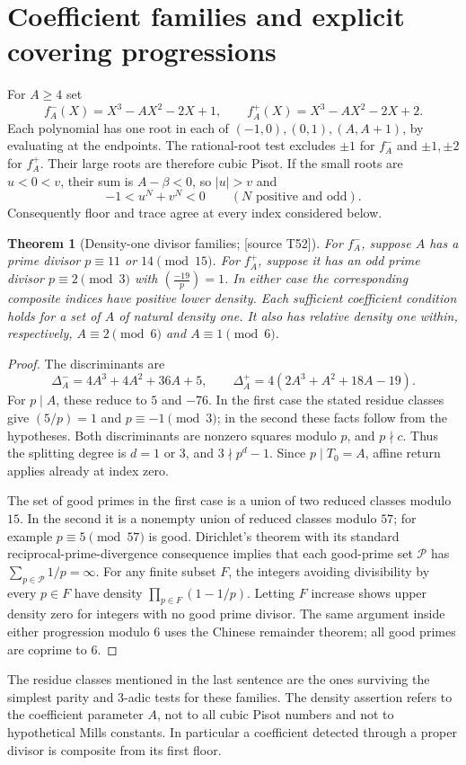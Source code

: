 \documentclass[11pt,a4paper]{article}
\newtheorem{theorem}{Theorem}[section]
\theoremstyle{definition}\newtheorem{definition}[theorem]{Definition}
\theoremstyle{remark}\newtheorem{remark}[theorem]{Remark}
\newcommand{\sourceT}[1]{\textup{[source T#1]}}
\begin{document}
\section{Coefficient families and explicit covering progressions}
For $A\ge4$ set
\begin{equation}\label{eq:families}
 f_A^-(X)=X^3-AX^2-2X+1,\qquad
 f_A^+(X)=X^3-AX^2-2X+2.
\end{equation}
Each polynomial has one root in each of $(-1,0),(0,1),(A,A+1)$, by evaluating at the endpoints. The rational-root test excludes $\pm1$ for $f_A^-$ and $\pm1,\pm2$ for $f_A^+$. Their large roots are therefore cubic Pisot. If the small roots are $u<0<v$, their sum is $A-\beta<0$, so $|u|>v$ and
\[
 -1<u^N+v^N<0\qquad(N\text{ positive and odd}).
\]
Consequently floor and trace agree at every index considered below.

\begin{theorem}[Density-one divisor families; \sourceT{52}]\label{thm:densityfamilies}
For $f_A^-$, suppose $A$ has a prime divisor $p\equiv11$ or $14\pmod{15}$. For $f_A^+$, suppose it has an odd prime divisor $p\equiv2\pmod3$ with $\left(\frac{-19}{p}\right)=1$. In either case the corresponding composite indices have positive lower density. Each sufficient coefficient condition holds for a set of $A$ of natural density one. It also has relative density one within, respectively, $A\equiv2\pmod6$ and $A\equiv1\pmod6$.
\end{theorem}
\begin{proof}
The discriminants are
\[
 \Delta_A^-=4A^3+4A^2+36A+5,\qquad
 \Delta_A^+=4(2A^3+A^2+18A-19).
\]
For $p\mid A$, these reduce to $5$ and $-76$. In the first case the stated residue classes give $(5/p)=1$ and $p\equiv-1\pmod3$; in the second these facts follow from the hypotheses. Both discriminants are nonzero squares modulo $p$, and $p\nmid c$. Thus the splitting degree is $d=1$ or $3$, and $3\nmid p^d-1$. Since $p\mid T_0=A$, affine return applies already at index zero.

The set of good primes in the first case is a union of two reduced classes modulo $15$. In the second it is a nonempty union of reduced classes modulo $57$; for example $p\equiv5\pmod{57}$ is good. Dirichlet's theorem with its standard reciprocal-prime-divergence consequence implies that each good-prime set $\mathcal P$ has $\sum_{p\in\mathcal P}1/p=\infty$. For any finite subset $F$, the integers avoiding divisibility by every $p\in F$ have density $\prod_{p\in F}(1-1/p)$. Letting $F$ increase shows upper density zero for integers with no good prime divisor. The same argument inside either progression modulo $6$ uses the Chinese remainder theorem; all good primes are coprime to $6$.
\end{proof}
The residue classes mentioned in the last sentence are the ones surviving the simplest parity and $3$-adic tests for these families. The density assertion refers to the coefficient parameter $A$, not to all cubic Pisot numbers and not to hypothetical Mills constants. In particular a coefficient detected through a proper divisor is composite from its first floor.
\end{document}

